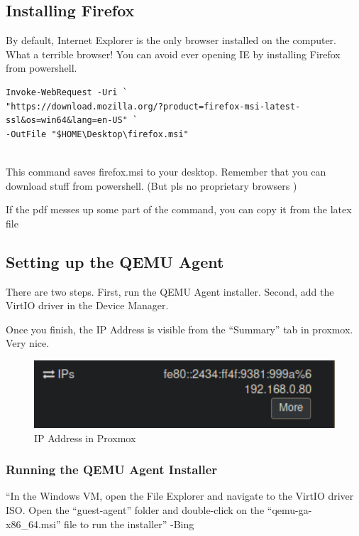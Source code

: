 \documentclass{article}
\begin{document}
\subsection{Installing Firefox}
By default, Internet Explorer is the only browser installed on the computer. What a terrible browser! You can avoid ever opening IE by installing Firefox from powershell. 
\begin{lstlisting}[breaklines=true, columns=fullflexible]
Invoke-WebRequest -Uri `
"https://download.mozilla.org/?product=firefox-msi-latest-ssl&os=win64&lang=en-US" `
-OutFile "$HOME\Desktop\firefox.msi"
    
\end{lstlisting}
        

\noindent This command saves firefox.msi to your desktop. Remember that you can download stuff from powershell. (But pls no proprietary browsers \Vomey{})

\noindent If the pdf messes up some part of the command, you can copy it from the latex file

\subsection{Setting up the QEMU Agent}
There are two steps. First, run the QEMU Agent installer. Second, add the VirtIO driver in the Device Manager.

Once you finish, the IP Address is visible from the “Summary” tab in proxmox. Very nice.

\begin{figure}[H]
    \centering
    \includegraphics[width=1\textwidth]{successfulAgentIPThingie.png}
    \caption{IP Address in Proxmox}
    \label{fig:successfulAgentIPThingie}
\end{figure}

\subsubsection{Running the QEMU Agent Installer}
“In the Windows VM, open the File Explorer and navigate to the VirtIO driver ISO. Open the “guest-agent” folder and double-click on the “qemu-ga-x86\_64.msi” file to run the installer” -Bing
\end{document}
